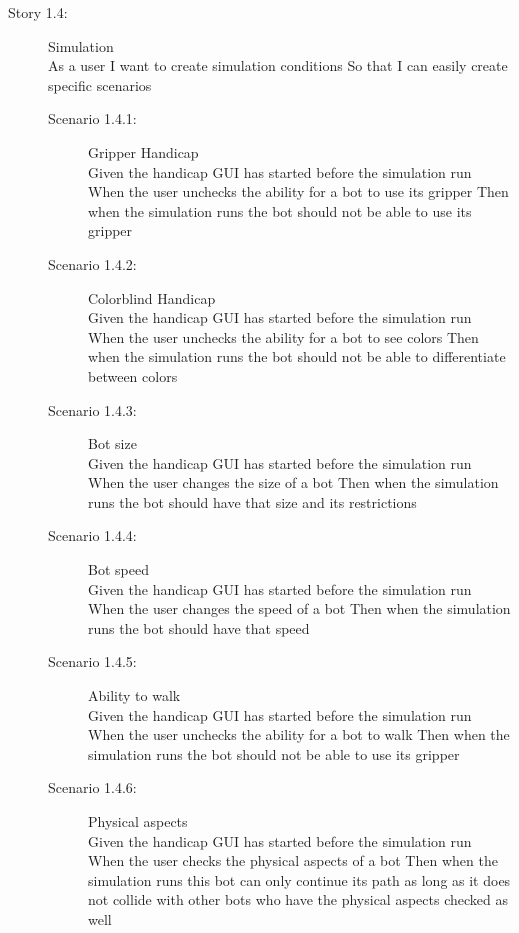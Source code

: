 \begin{description}
	\item[Story 1.4:] Simulation\\
	As a user
	I want to create simulation conditions
	So that I can easily create specific scenarios
	
	\begin{description}
		\item[Scenario 1.4.1:] Gripper Handicap\\
		Given the handicap GUI has started before the simulation run
		When the user unchecks the ability for a bot to use its gripper
		Then when the simulation runs the bot should not be able to use its gripper

		\item[Scenario 1.4.2:] Colorblind Handicap\\
		Given the handicap GUI has started before the simulation run
		When the user unchecks the ability for a bot to see colors
		Then when the simulation runs the bot should not be able to differentiate between colors

		\item[Scenario 1.4.3:] Bot size\\
		Given the handicap GUI has started before the simulation run
		When the user changes the size of a bot
		Then when the simulation runs the bot should have that size and its restrictions

		\item[Scenario 1.4.4:] Bot speed\\
		Given the handicap GUI has started before the simulation run
		When the user changes the speed of a bot
		Then when the simulation runs the bot should have that speed

		\item[Scenario 1.4.5:] Ability to walk\\
		Given the handicap GUI has started before the simulation run
		When the user unchecks the ability for a bot to walk
		Then when the simulation runs the bot should not be able to use its gripper

		\item[Scenario 1.4.6:] Physical aspects\\
		Given the handicap GUI has started before the simulation run
		When the user checks the physical aspects of a bot
		Then when the simulation runs this bot can only continue its path as long as it does not collide with other bots who have the physical aspects checked as well
	\end{description}
\end{description}